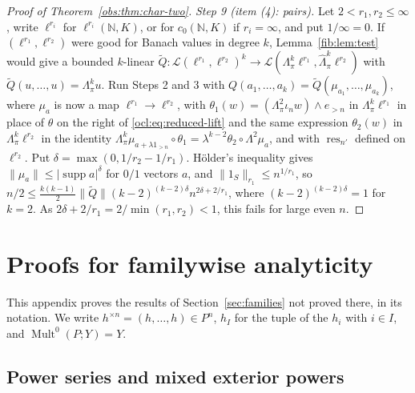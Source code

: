 \documentclass[11pt]{amsart}
\theoremstyle{definition}
\theoremstyle{remark}
\numberwithin{equation}{section}
\newcommand{\N}{\mathbb N}
\newcommand{\cL}{\mathcal L}
\newcommand{\Mult}{\operatorname{Mult}}
\newcommand{\abs}[1]{\lvert #1\rvert}
\newcommand{\norm}[1]{\lVert #1\rVert}
\theoremstyle{plain}
\theoremstyle{definition}
\theoremstyle{plain}
\begin{document}
\begin{proof}[Proof of Theorem~\ref{obs:thm:char-two}]
\emph{Step 9 (item (4): pairs).} Let $2<r_1,r_2\le\infty$, write $\ell^{r_i}$ for $\ell^{r_i}(\N,K)$, or for
$c_0(\N,K)$ if $r_i=\infty$, and put $1/\infty=0$. If $(\ell^{r_1},\ell^{r_2})$ were good for Banach values in degree
$k$, Lemma~\ref{fib:lem:test} would give a bounded $k$-linear
$\widetilde Q\colon\cL(\ell^{r_1},\ell^{r_2})^k\to\cL(\Lambda^k_\pi\ell^{r_1},\widehat\Lambda^k_\pi\ell^{r_2})$ with
$\widetilde Q(u,\dots,u)=\Lambda^k_\pi u$. Run Steps 2 and 3 with
$Q(a_1,\dots,a_k)=\widetilde Q(\mu_{a_1},\dots,\mu_{a_k})$, where $\mu_a$ is now a map $\ell^{r_1}\to\ell^{r_2}$, with
$\theta_1(w)=(\Lambda^2_\pi\iota_nw)\wedge e_{>n}$ in $\Lambda^k_\pi\ell^{r_1}$ in place of $\theta$ on the right of
\eqref{ocl:eq:reduced-lift} and the same expression $\theta_2(w)$ in $\Lambda^k_\pi\ell^{r_2}$ in the identity
$\Lambda^k_\pi\mu_{a+\lambda1_{>n}}\circ\theta_1=\lambda^{k-2}\theta_2\circ\Lambda^2\mu_a$, and with
$\operatorname{res}_{n'}$ defined on $\ell^{r_2}$. Put $\delta=\max(0,1/r_2-1/r_1)$. H\"older's inequality gives
$\norm{\mu_a}\le\abs{\operatorname{supp}a}^\delta$ for $0/1$ vectors $a$, and $\norm{1_S}_{r_1}\le n^{1/r_1}$, so
$n/2\le\frac{k(k-1)}2\norm{\widetilde Q}(k-2)^{(k-2)\delta}n^{2\delta+2/r_1}$, where $(k-2)^{(k-2)\delta}=1$ for $k=2$.
As $2\delta+2/r_1=2/\min(r_1,r_2)<1$, this fails for large even $n$.
\end{proof}

\section{Proofs for familywise analyticity}\label{app:families}

This appendix proves the results of Section~\ref{sec:families} not proved there, in its notation. We write
$h^{\times n}=(h,\dots,h)\in P^n$, $h_I$ for the tuple of the $h_i$ with $i\in I$, and $\Mult^0(P;Y)=Y$.

\subsection{Power series and mixed exterior powers}\label{fmo:ssec:tools}
\end{document}
